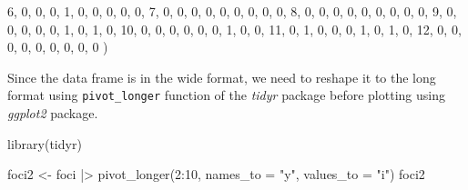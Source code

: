 \documentclass[
  letterpaper,
]{book}
\newenvironment{Shaded}{\begin{snugshade}}{\end{snugshade}}
\newcommand{\AttributeTok}[1]{\textcolor[rgb]{0.40,0.45,0.13}{#1}}
\newcommand{\DecValTok}[1]{\textcolor[rgb]{0.68,0.00,0.00}{#1}}
\newcommand{\FunctionTok}[1]{\textcolor[rgb]{0.28,0.35,0.67}{#1}}
\newcommand{\NormalTok}[1]{\textcolor[rgb]{0.00,0.23,0.31}{#1}}
\newcommand{\OtherTok}[1]{\textcolor[rgb]{0.00,0.23,0.31}{#1}}
\newcommand{\SpecialCharTok}[1]{\textcolor[rgb]{0.37,0.37,0.37}{#1}}
\newcommand{\StringTok}[1]{\textcolor[rgb]{0.13,0.47,0.30}{#1}}
\begin{document}
\begin{Shaded}
\begin{Highlighting}[]
           \DecValTok{6}\NormalTok{,   }\DecValTok{0}\NormalTok{,   }\DecValTok{0}\NormalTok{,   }\DecValTok{0}\NormalTok{,   }\DecValTok{1}\NormalTok{,   }\DecValTok{0}\NormalTok{,   }\DecValTok{0}\NormalTok{,   }\DecValTok{0}\NormalTok{,   }\DecValTok{0}\NormalTok{,   }\DecValTok{0}\NormalTok{,}
           \DecValTok{7}\NormalTok{,   }\DecValTok{0}\NormalTok{,   }\DecValTok{0}\NormalTok{,   }\DecValTok{0}\NormalTok{,   }\DecValTok{0}\NormalTok{,   }\DecValTok{0}\NormalTok{,   }\DecValTok{0}\NormalTok{,   }\DecValTok{0}\NormalTok{,   }\DecValTok{0}\NormalTok{,   }\DecValTok{0}\NormalTok{,}
           \DecValTok{8}\NormalTok{,   }\DecValTok{0}\NormalTok{,   }\DecValTok{0}\NormalTok{,   }\DecValTok{0}\NormalTok{,   }\DecValTok{0}\NormalTok{,   }\DecValTok{0}\NormalTok{,   }\DecValTok{0}\NormalTok{,   }\DecValTok{0}\NormalTok{,   }\DecValTok{0}\NormalTok{,   }\DecValTok{0}\NormalTok{,}
           \DecValTok{9}\NormalTok{,   }\DecValTok{0}\NormalTok{,   }\DecValTok{0}\NormalTok{,   }\DecValTok{0}\NormalTok{,   }\DecValTok{0}\NormalTok{,   }\DecValTok{0}\NormalTok{,   }\DecValTok{1}\NormalTok{,   }\DecValTok{0}\NormalTok{,   }\DecValTok{1}\NormalTok{,   }\DecValTok{0}\NormalTok{,}
          \DecValTok{10}\NormalTok{,   }\DecValTok{0}\NormalTok{,   }\DecValTok{0}\NormalTok{,   }\DecValTok{0}\NormalTok{,   }\DecValTok{0}\NormalTok{,   }\DecValTok{0}\NormalTok{,   }\DecValTok{0}\NormalTok{,   }\DecValTok{1}\NormalTok{,   }\DecValTok{0}\NormalTok{,   }\DecValTok{0}\NormalTok{,}
          \DecValTok{11}\NormalTok{,   }\DecValTok{0}\NormalTok{,   }\DecValTok{1}\NormalTok{,   }\DecValTok{0}\NormalTok{,   }\DecValTok{0}\NormalTok{,   }\DecValTok{0}\NormalTok{,   }\DecValTok{1}\NormalTok{,   }\DecValTok{0}\NormalTok{,   }\DecValTok{1}\NormalTok{,   }\DecValTok{0}\NormalTok{,}
          \DecValTok{12}\NormalTok{,   }\DecValTok{0}\NormalTok{,   }\DecValTok{0}\NormalTok{,   }\DecValTok{0}\NormalTok{,   }\DecValTok{0}\NormalTok{,   }\DecValTok{0}\NormalTok{,   }\DecValTok{0}\NormalTok{,   }\DecValTok{0}\NormalTok{,   }\DecValTok{0}\NormalTok{,   }\DecValTok{0}
\NormalTok{          )}
\end{Highlighting}
\end{Shaded}

Since the data frame is in the wide format, we need to reshape it to the
long format using \texttt{pivot\_longer} function of the \emph{tidyr}
package before plotting using \emph{ggplot2} package.

\begin{Shaded}
\begin{Highlighting}[]
\FunctionTok{library}\NormalTok{(tidyr)}

\NormalTok{foci2 }\OtherTok{\textless{}{-}}\NormalTok{ foci }\SpecialCharTok{|\textgreater{}} 
  \FunctionTok{pivot\_longer}\NormalTok{(}\DecValTok{2}\SpecialCharTok{:}\DecValTok{10}\NormalTok{, }\AttributeTok{names\_to =} \StringTok{"y"}\NormalTok{, }\AttributeTok{values\_to =} \StringTok{"i"}\NormalTok{)}
\NormalTok{foci2}
\end{Highlighting}
\end{Shaded}
\end{document}
